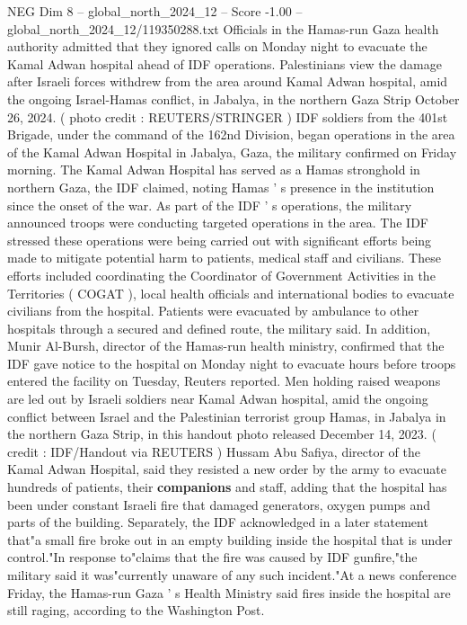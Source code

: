 \begin{textsample}{NEG Dim 8 – global\_north\_2024\_12 – Score -1.00 – global\_north\_2024\_12/119350288.txt}  \label{ex:f8_neg_111}
Officials in the Hamas-run Gaza health authority admitted that they ignored calls on Monday night to evacuate the Kamal Adwan hospital ahead of IDF operations.
Palestinians view the damage after Israeli forces withdrew from the area around Kamal Adwan hospital, amid the ongoing Israel-Hamas conflict, in Jabalya, in the northern Gaza Strip October 26, 2024. ( photo credit : REUTERS/STRINGER ) IDF soldiers from the 401st Brigade, under the command of the 162nd Division, began operations in the area of the Kamal Adwan Hospital in Jabalya, Gaza, the military confirmed on Friday morning.
The Kamal Adwan Hospital has served as a Hamas stronghold in northern Gaza, the IDF claimed, noting Hamas ' s presence in the institution since the onset of the war.
As part of the IDF ' s operations, the military announced troops were conducting targeted operations in the area.
The IDF stressed these operations were being carried out with significant efforts being made to mitigate potential harm to patients, medical staff and civilians.
These efforts included coordinating the Coordinator of Government Activities in the Territories ( COGAT ), local health officials and international bodies to evacuate civilians from the hospital.
Patients were evacuated by ambulance to other hospitals through a secured and defined route, the military said.
In addition, Munir Al-Bursh, director of the Hamas-run health ministry, confirmed that the IDF gave notice to the hospital on Monday night to evacuate hours before troops entered the facility on Tuesday, Reuters reported.
Men holding raised weapons are led out by Israeli soldiers near Kamal Adwan hospital, amid the ongoing conflict between Israel and the Palestinian terrorist group Hamas, in Jabalya in the northern Gaza Strip, in this handout photo released December 14, 2023. ( credit : IDF/Handout via REUTERS ) Hussam Abu Safiya, director of the Kamal Adwan Hospital, said they resisted a new order by the army to evacuate hundreds of patients, their \textbf{companions} and staff, adding that the hospital has been under constant Israeli fire that damaged generators, oxygen pumps and parts of the building.
Separately, the IDF acknowledged in a later statement that"a small fire broke out in an empty building inside the hospital that is under control."In response to"claims that the fire was caused by IDF gunfire,"the military said it was"currently unaware of any such incident."At a news conference Friday, the Hamas-run Gaza ' s Health Ministry said fires inside the hospital are still raging, according to the Washington Post.

\end{textsample}
